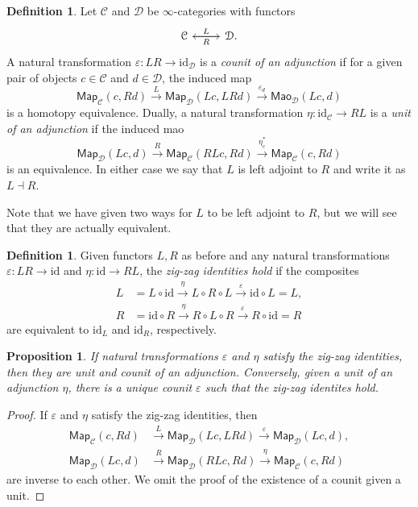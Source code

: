 \documentclass[10pt]{amsart}
\newtheorem{prop}[thm]{Proposition}
\theoremstyle{definition}
\newtheorem{defn}[thm]{Definition}
\theoremstyle{remark}
\theoremstyle{plain}
\theoremstyle{definition}
\theoremstyle{remark}
\newcommand{\ep}{\varepsilon}
\newcommand{\mc}[1]{\mathcal{#1}}
\newcommand{\mr}[1]{\mathrm{#1}}
\newcommand{\ms}[1]{\mathsf{#1}}
\newcommand{\1}{\mathbf{1}}
\newcommand{\2}{\mathbf{2}}
\newcommand{\3}{\mathbf{3}}
\begin{document}
\begin{defn}
    Let $\mc{C}$ and $\mc{D}$ be $\infty$-categories with functors
    \begin{equation*}
    \begin{tikzcd}
        \mc{C} \ar{r}{L} & \mc{D} \ar{l}{R}.
    \end{tikzcd}
    \end{equation*}
    A natural transformation $\ep \colon LR \to \mr{id}_{\mc{D}}$ is a \textit{counit of an adjunction} if for a given pair of objects $c \in \mc{C}$ and $d \in \mc{D}$, the induced map
    \[ \ms{Map}_{\mc{C}}(c, Rd) \xrightarrow{L} \ms{Map}_{\mc{D}}(Lc, LRd) \xrightarrow{\ep_d} \ms{Mao}_{\mc{D}}(Lc, d) \]
    is a homotopy equivalence. Dually, a natural transformation $\eta \colon \mr{id}_{\mc{C}} \to RL$ is a \textit{unit of an adjunction} if the induced mao
    \[ \ms{Map}_{\mc{D}}(Lc, d) \xrightarrow{R} \ms{Map}_{\mc{C}}(RL c, Rd) \xrightarrow{\eta_c^*} \ms{Map}_{\mc{C}}(c, Rd) \]
    is an equivalence. In either case we say that $L$ is left adjoint to $R$ and write it as $L \dashv R$.
\end{defn}

Note that we have given two ways for $L$ to be left adjoint to $R$, but we will see that they are actually equivalent. 

\begin{defn}
    Given functors $L, R$ as before and any natural transformations $\ep \colon LR \to \mr{id}$ and $\eta \colon \mr{id} \to RL$, the \textit{zig-zag identities hold} if the composites
    \begin{align*}
        L &= L \circ \mr{id} \xrightarrow{\eta} L \circ R \circ L \xrightarrow{\ep} \mr{id} \circ L = L, \\
        R &= \mr{id} \circ R \xrightarrow{\eta} R \circ L \circ R \xrightarrow{\ep} R \circ \mr{id} = R
    \end{align*}
    are equivalent to $\mr{id}_L$ and $\mr{id}_R$, respectively.
\end{defn}

\begin{prop}
    If natural transformations $\ep$ and $\eta$ satisfy the zig-zag identities, then they are unit and counit of an adjunction. Conversely, given a unit of an adjunction $\eta$, there is a unique counit $\ep$ such that the zig-zag identites hold.
\end{prop}

\begin{proof}
    If $\ep$ and $\eta$ satisfy the zig-zag identities, then
    \begin{align*}
        \ms{Map}_{\mc{C}}(c, Rd) &\xrightarrow{L} \ms{Map}_{\mc{D}}(Lc, LRd) \xrightarrow{\ep} \ms{Map}_{\mc{D}}(Lc, d), \\
        \ms{Map}_{\mc{D}}(Lc, d) &\xrightarrow{R} \ms{Map}_{\mc{D}}(RLc, Rd) \xrightarrow{\eta} \ms{Map}_{\mc{C}}(c, Rd)
    \end{align*}
    are inverse to each other. We omit the proof of the existence of a counit given a unit.
\end{proof}
\end{document}
